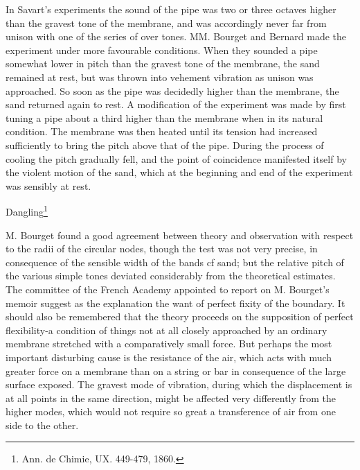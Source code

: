 In Savart's experiments the sound of the pipe was two or three octaves
higher than the gravest tone of the membrane, and was accordingly never
far from unison with one of the series of over tones. MM. Bourget and
Bernard made the experiment under more favourable conditions. When they
sounded a pipe somewhat lower in pitch than the gravest tone of the
membrane, the sand remained at rest, but was thrown into vehement
vibration as unison was approached. So soon as the pipe was decidedly
higher than the membrane, the sand returned again to rest. A
modification of the experiment was made by first tuning a pipe about a
third higher than the membrane when in its natural condition. The
membrane was then heated until its tension had increased sufficiently to
bring the pitch above that of the pipe. During the process of cooling
the pitch gradually fell, and the point of coincidence manifested itself
by the violent motion of the sand, which at the beginning and end of the
experiment was sensibly at rest.

Dangling\footnote{ Ann. de Chimie, UX. 449-479, 1860.}

M. Bourget found a good agreement between theory and observation with
respect to the radii of the circular nodes, though the test was not very
precise, in consequence of the sensible width of
the bands cf sand; but the relative pitch of the various simple tones
deviated considerably from the theoretical estimates. The committee of
the French Academy appointed to report on M. Bourget's memoir suggest as
the explanation the want of perfect fixity of the boundary. It should
also be remembered that the theory proceeds on the supposition of
perfect flexibility-a condition of things not at all closely approached
by an ordinary membrane stretched with a comparatively small force. But
perhaps the most important disturbing cause is the resistance of the
air, which acts with much greater force on a membrane than on a string
or bar in consequence of the large surface exposed. The gravest mode of
vibration, during which the displacement is at all points in the same
direction, might be affected very differently from the higher modes,
which would not require so great a transference of air from one side to
the other.



